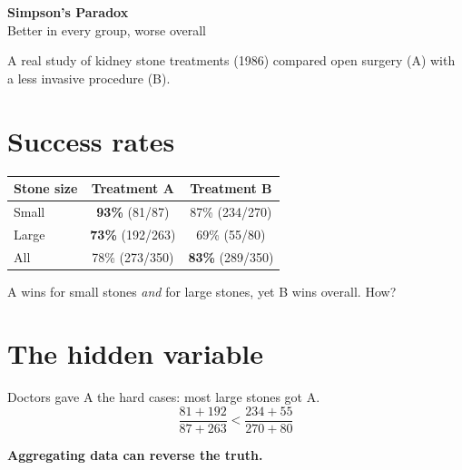 \documentclass[11pt]{article}
\begin{document}
\begin{center}
  {\LARGE\bfseries Simpson's Paradox}\\[4pt]
  {\large Better in every group, worse overall}
\end{center}

A real study of kidney stone treatments (1986) compared
open surgery (A) with a less invasive procedure (B).

\section*{Success rates}
\begin{center}
\begin{tabular}{lcc}
  \hline
  Stone size & Treatment A & Treatment B \\
  \hline
  Small & \textbf{93\%} (81/87) & 87\% (234/270) \\
  Large & \textbf{73\%} (192/263) & 69\% (55/80) \\
  \hline
  All & 78\% (273/350) & \textbf{83\%} (289/350) \\
  \hline
\end{tabular}
\end{center}

A wins for small stones \emph{and} for large stones, yet B
wins overall. How?

\begin{center}
\end{center}

\section*{The hidden variable}
Doctors gave A the hard cases: most large stones got A.
\[
  \frac{81 + 192}{87 + 263} < \frac{234 + 55}{270 + 80}
\]
\centerline{\bfseries Aggregating data can reverse the truth.}
\end{document}
